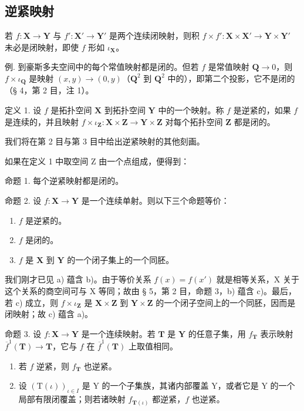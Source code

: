 \subsection{逆紧映射}

若 \(f: \mathbf{X} \to \mathbf{Y}\) 与 \(f': \mathbf{X}' \to \mathbf{Y}'\) 是两个连续闭映射，则积 \(f \times f': \mathbf{X} \times \mathbf{X}' \to \mathbf{Y} \times \mathbf{Y}'\) 未必是闭映射，即使 \(f\) 形如 \(\iota_{\mathbf{X}}\)。

例. 到豪斯多夫空间中的每个常值映射都是闭的。但若 \(f\) 是常值映射 \(\mathbf{Q} \to 0\)，则 \(f \times \iota_{\mathbf{Q}}\) 是映射 \((x, y) \to (0, y)\)（\(\mathbf{Q}^2\) 到 \(\mathbf{Q}^2\) 中的），即第二个投影，它不是闭的（§ 4，第 2 目，注 1）。

定义 1. 设 \(f\) 是拓扑空间 \(\mathbf{X}\) 到拓扑空间 \(\mathbf{Y}\) 中的一个映射。称 \(f\) 是逆紧的，如果 \(f\) 是连续的，并且映射 \(f \times \iota_{\mathbf{Z}} : \mathbf{X} \times \mathbf{Z} \to \mathbf{Y} \times \mathbf{Z}\) 对每个拓扑空间 \(\mathbf{Z}\) 都是闭的。

我们将在第 2 目与第 3 目中给出逆紧映射的其他刻画。

如果在定义 1 中取空间 Z 由一个点组成，便得到：

命题 1. 每个逆紧映射都是闭的。

命题 2. 设 \(f: \mathbf{X} \to \mathbf{Y}\) 是一个连续单射。则以下三个命题等价：

\begin{enumerate}
\def\labelenumi{\alph{enumi})}
\item
  \(f\) 是逆紧的。
\item
  \(f\) 是闭的。
\item
  \(f\) 是 \(\mathbf{X}\) 到 \(\mathbf{Y}\) 的一个闭子集上的一个同胚。
\end{enumerate}

我们刚才已见 a) 蕴含 b)。由于等价关系 \(f(x) = f(x')\) 就是相等关系，X 关于这个关系的商空间可与 X 等同；故由 § 5，第 2 目，命题 3，b) 蕴含 c)。最后，若 c) 成立，则 \(f \times \iota_{\mathbf{Z}}\) 是 \(\mathbf{X} \times \mathbf{Z}\) 到 \(\mathbf{Y} \times \mathbf{Z}\) 的一个闭子空间上的一个同胚，因而是闭映射；故 c) 蕴含 a)。

命题 3. 设 \(f: \mathbf{X} \to \mathbf{Y}\) 是一个连续映射。若 \(\mathbf{T}\) 是 \(\mathbf{Y}\) 的任意子集，用 \(f_{\mathbf{T}}\) 表示映射 \(\overline{f}^{1}(\mathbf{T}) \to \mathbf{T}\)，它与 \(f\) 在 \(\overline{f}^{1}(\mathbf{T})\) 上取值相同。

\begin{enumerate}
\def\labelenumi{\alph{enumi})}
\item
  若 \(f\) 逆紧，则 \(f_{\mathbf{T}}\) 也逆紧。
\item
  设 \((\mathrm{T}(\iota))_{\iota\in I}\) 是 Y 的一个子集族，其诸内部覆盖 Y，或者它是 Y 的一个局部有限闭覆盖；则若诸映射 \(f_{\mathbf{T}(\iota)}\) 都逆紧，\(f\) 也逆紧。
\end{enumerate}

